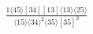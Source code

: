 \documentclass[varwidth, border=5pt]{standalone}
\begin{document}
\begin{my}
$\begin{gathered}
\scriptscriptstyle\frac{1⟨45⟩[34][13]⟨13⟩⟨25⟩}{⟨15⟩⟨34⟩^2⟨35⟩[35]^2}
\end{gathered}$
\end{my}
\end{document}
